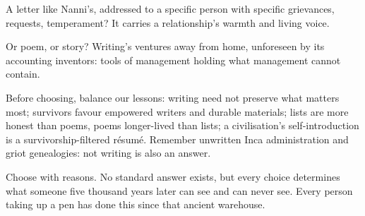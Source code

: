 A letter like Nanni's, addressed to a specific person with specific grievances, requests, temperament? It carries a relationship's warmth and living voice.

Or poem, or story? Writing's ventures away from home, unforeseen by its accounting inventors: tools of management holding what management cannot contain.

Before choosing, balance our lessons: writing need not preserve what matters most; survivors favour empowered writers and durable materials; lists are more honest than poems, poems longer-lived than lists; a civilisation's self-introduction is a survivorship-filtered résumé. Remember unwritten Inca administration and griot genealogies: not writing is also an answer.

Choose with reasons. No standard answer exists, but every choice determines what someone five thousand years later can see and can never see. Every person taking up a pen has done this since that ancient warehouse.
